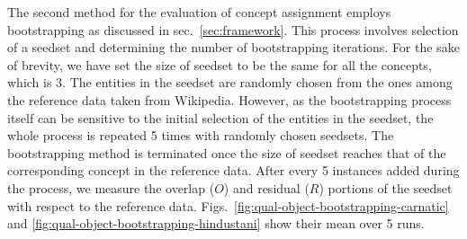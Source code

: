 \documentclass{llncs}
\begin{document}
The second method for the evaluation of concept assignment employs bootstrapping as discussed in sec.~\ref{sec:framework}. This process involves selection of a seedset and determining the number of bootstrapping iterations. For the sake of brevity, we have set the size of seedset to be the same for all the concepts, which is 3. The entities in the seedset are randomly chosen from the ones among the reference data taken from Wikipedia. However, as the bootstrapping process itself can be sensitive to the initial selection of the entities in the seedset, the whole process is repeated 5 times with randomly chosen seedsets. The bootstrapping method is terminated once the size of seedset reaches that of the corresponding concept in the reference data. After every 5 instances added during the process, we measure the overlap ($O$) and residual ($R$) portions of the seedset with respect to the reference data.  Figs.~\ref{fig:qual-object-bootstrapping-carnatic} and \ref{fig:qual-object-bootstrapping-hindustani} show their mean over 5 runs. 
\end{document}

